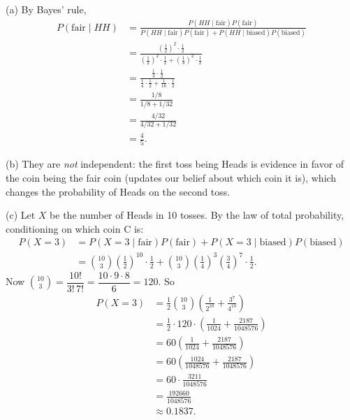 \documentclass[11pt]{article}
\begin{document}
(a) By Bayes' rule,
\begin{align*}
P(\text{fair}\mid HH) &= \frac{P(HH\mid\text{fair})P(\text{fair})}{P(HH\mid\text{fair})P(\text{fair}) + P(HH\mid\text{biased})P(\text{biased})} \\
&= \frac{\left(\tfrac12\right)^2\cdot\tfrac12}{\left(\tfrac12\right)^2\cdot\tfrac12 + \left(\tfrac14\right)^2\cdot\tfrac12} \\
&= \frac{\tfrac14\cdot\tfrac12}{\tfrac14\cdot\tfrac12+\tfrac{1}{16}\cdot\tfrac12} \\
&= \frac{1/8}{1/8+1/32} \\
&= \frac{4/32}{4/32+1/32} \\
&= \frac{4}{5}.
\end{align*}

(b) They are \emph{not} independent: the first toss being Heads is evidence in favor of the coin being the fair coin (updates our belief about which coin it is), which changes the probability of Heads on the second toss.

(c) Let $X$ be the number of Heads in 10 tosses. By the law of total probability, conditioning on which coin C is:
\begin{align*}
P(X=3) &= P(X=3\mid\text{fair})P(\text{fair}) + P(X=3\mid\text{biased})P(\text{biased}) \\
&= \binom{10}{3}\left(\frac12\right)^{10}\cdot\frac12 + \binom{10}{3}\left(\frac14\right)^3\left(\frac34\right)^7\cdot\frac12.
\end{align*}
Now $\binom{10}{3} = \dfrac{10!}{3!\,7!} = \dfrac{10\cdot9\cdot8}{6} = 120$. So
\begin{align*}
P(X=3) &= \frac12\binom{10}{3}\left(\frac{1}{2^{10}} + \frac{3^7}{4^{10}}\right) \\
&= \frac12 \cdot 120 \cdot \left(\frac{1}{1024} + \frac{2187}{1048576}\right) \\
&= 60\left(\frac{1}{1024}+\frac{2187}{1048576}\right) \\
&= 60\left(\frac{1024}{1048576}+\frac{2187}{1048576}\right) \\
&= 60\cdot\frac{3211}{1048576} \\
&= \frac{192660}{1048576} \\
&\approx 0.1837.
\end{align*}
\end{document}

